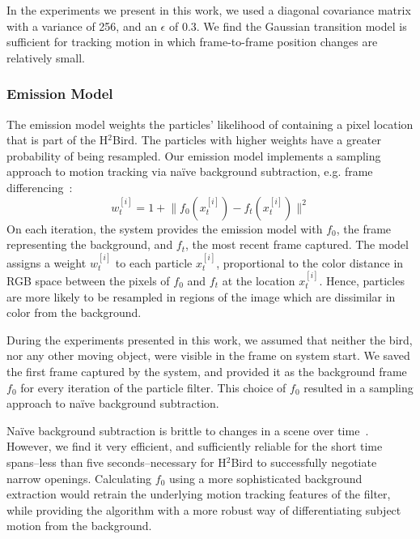 \documentclass{aamas2013}
\providecommand{\norm}[1]{\lVert#1\rVert}
\begin{document}
In the experiments we present in this work, we used a diagonal covariance matrix 
with a variance of 256, and an $\epsilon$ of 0.3. We find the Gaussian 
transition model is sufficient for tracking motion in which frame-to-frame 
position changes are relatively small.

\subsubsection{Emission Model}
The emission model weights the particles' likelihood of containing a pixel location that is part of the H$^2$Bird. The particles with higher weights have a greater probability of being resampled. Our emission model implements a sampling
approach to motion tracking via na\"{i}ve background subtraction, e.g. frame 
differencing~\cite{Ahad2011Computer}: 
\begin{equation}
\label{eq:emission_model}
w^{[i]}_t = 1 + \norm{f_0(x^{[i]}_t)-f_t(x^{[i]}_t)}^2
\end{equation} 
On each iteration, the system provides the emission 
model with $f_0$, the frame representing the background, and $f_t$, the most 
recent frame captured. The model assigns a weight $w^{[i]}_t$ to each 
particle $x^{[i]}_t$, proportional to the color distance in RGB space 
between the pixels of $f_0$ and $f_t$ at the location $x^{[i]}_t$.
Hence, particles are more likely to be resampled in regions of 
the image which are dissimilar in color from the background.

During the experiments presented in this work, we assumed that neither the 
bird, nor any other moving object, were visible in the frame on system 
start. We saved the first frame captured by the system, and provided it as 
the background frame $f_0$ for every iteration of the particle filter. This 
choice of $f_0$ resulted in a sampling approach to na\"{i}ve background 
subtraction. 

Na\"{i}ve background subtraction is brittle to changes in a scene over 
time~\cite{Ahad2011Computer}. However, we find it very efficient, and sufficiently 
reliable for the short time spans--less than five seconds--necessary for 
H$^2$Bird to successfully negotiate narrow openings. Calculating $f_0$ 
using a more sophisticated background extraction would retrain the 
underlying motion tracking features of the filter, while providing the 
algorithm with a more robust way of differentiating subject motion from the 
background.
\end{document}
